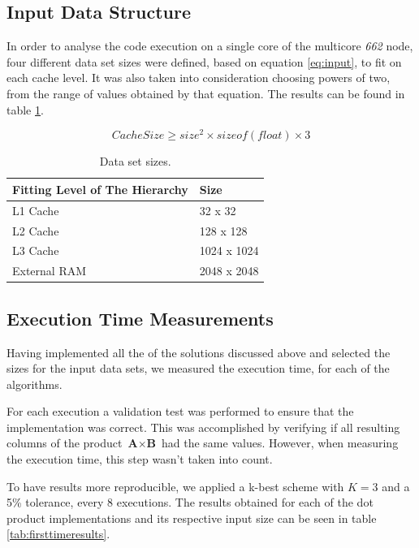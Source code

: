 \documentclass[twoside,twocolumn]{article}
\begin{document}
\subsection{Input Data Structure}

In order to analyse the code execution on a single core of the multicore \emph{662} node, four different data set sizes were defined, based on equation \ref{eq:input}, to fit on each cache level. It was also taken into consideration choosing powers of two, from the range of values obtained by that equation. The results can be found in table \ref{tab:datasetsizes}.

\begin{equation} \label{eq:input}
    Cache Size \geqslant size^{2} \times sizeof(float) \times 3
\end{equation}

\begin{table}[ht]
\begin{tabular}{|l|l|}
\hline
Fitting Level of The Hierarchy & Size                            \\ \hline
L1 Cache                       & 32 x 32     \\ \hline
L2 Cache                       & 128 x 128   \\ \hline
L3 Cache                       & 1024 x 1024 \\ \hline
External RAM                   & 2048 x 2048 \\ \hline
\end{tabular}
\caption{Data set sizes.}
\label{tab:datasetsizes}
\end{table}

\subsection{Execution Time Measurements}

Having implemented all the of the solutions discussed above and selected the sizes for the input data sets, we measured the execution time, for each of the algorithms.

For each execution a validation test was performed to ensure that the implementation was correct. This was accomplished by verifying if all resulting columns of the product $\textbf{A} \times \textbf{B}$ had the same values. However, when measuring the execution time, this step wasn't taken into count.

To have results more reproducible, we applied a k-best scheme with $K = 3$ and a 5\% tolerance, every 8 executions. The results obtained for each of the dot product implementations and its respective input size can be seen in table \ref{tab:firsttimeresults}.
\end{document}
